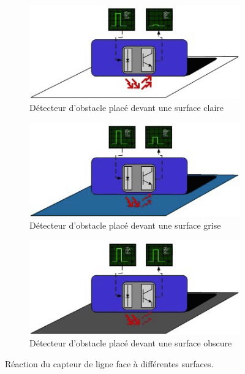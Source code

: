 \documentclass[10pt,fleqn]{article} %
\begin{document}
\begin{figure}[ht]
    \centering
    \begin{subfigure}[b]{.45\textwidth}
        \includegraphics[width=\textwidth]{images/capteur_clair-ConvertImage.png}
        \caption{Détecteur d'obstacle placé devant une surface claire}
    \end{subfigure}
    \begin{subfigure}[b]{.45\textwidth}
        \includegraphics[width=\textwidth]{images/capteur_fonce-ConvertImage.png}
        \caption{Détecteur d'obstacle placé devant une surface grise}
    \end{subfigure}
    
    \begin{subfigure}[b]{.5\textwidth}
        \includegraphics[width=\textwidth]{images/capteur_obscur-ConvertImage.png}
        \caption{Détecteur d'obstacle placé devant une surface obscure}
    \end{subfigure}
    
    \caption{Réaction du capteur de ligne face à différentes surfaces.}
    \label{fig:surfaces}
\end{figure}
\end{document}
